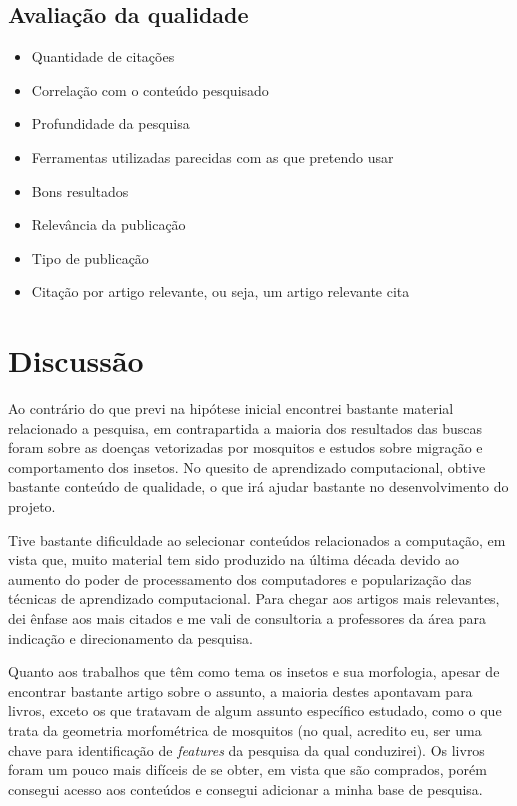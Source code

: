 \documentclass{article}
\begin{document}
\subsection{Avaliação da qualidade}
\begin{itemize}
    \item Quantidade de citações
    \item Correlação com o conteúdo pesquisado
    \item Profundidade da pesquisa
    \item Ferramentas utilizadas parecidas com as que pretendo usar
    \item Bons resultados
    \item Relevância da publicação
    \item Tipo de publicação
    \item Citação por artigo relevante, ou seja, um artigo relevante cita
\end{itemize}

\section{Discussão}
Ao contrário do que previ na hipótese inicial encontrei bastante material relacionado a pesquisa, em contrapartida a maioria dos resultados das buscas foram sobre as doenças vetorizadas por mosquitos e estudos sobre migração e comportamento dos insetos. No quesito de aprendizado computacional, obtive bastante conteúdo de qualidade, o que irá ajudar bastante no desenvolvimento do projeto.

Tive bastante dificuldade ao selecionar conteúdos relacionados a computação, em vista que, muito material tem sido produzido na última década devido ao aumento do poder de processamento dos computadores e popularização das técnicas de aprendizado computacional. Para chegar aos artigos mais relevantes, dei ênfase aos mais citados e me vali de consultoria a professores da área para indicação e direcionamento da pesquisa.

Quanto aos trabalhos que têm como tema os insetos e sua morfologia, apesar de encontrar bastante artigo sobre o assunto, a maioria destes apontavam para livros, exceto os que tratavam de algum assunto específico estudado, como o \cite{Lorenz2017} que trata da geometria morfométrica de mosquitos (no qual, acredito eu, ser uma chave para identificação de \emph{features} da pesquisa da qual conduzirei). Os livros foram um pouco mais difíceis de se obter, em vista que são comprados, porém consegui acesso aos conteúdos e consegui adicionar a minha base de pesquisa.
\end{document}
